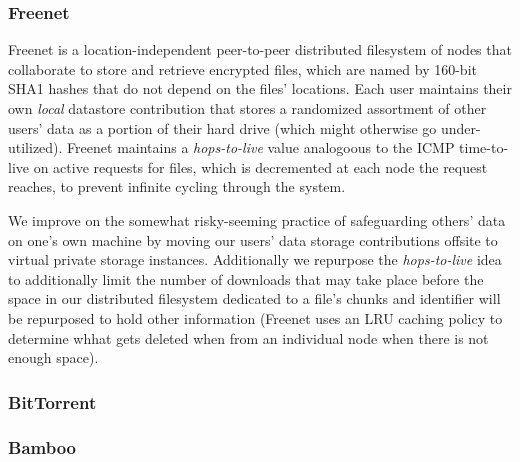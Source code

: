 \subsubsection*{Freenet}

Freenet is a location-independent peer-to-peer distributed filesystem of nodes that collaborate to store and retrieve encrypted files,
which are named by 160-bit SHA1 hashes that do not depend on the files' locations. Each user maintains their own \textit{local} datastore
contribution that stores a randomized assortment of other users' data as a portion of their hard drive (which might otherwise go
under-utilized). Freenet maintains a \textit{hops-to-live} value analogoous to
the ICMP time-to-live on active requests for files, which is decremented at each node the request reaches, to prevent infinite cycling
through the system.

We improve on the somewhat risky-seeming practice of safeguarding others' data on one's own machine by moving our
users' data storage contributions offsite to virtual private storage instances.
Additionally we repurpose the \textit{hops-to-live} idea to additionally limit the number of
downloads that may take place before the space in our distributed filesystem dedicated to a file's chunks and identifier will be
repurposed to hold other information (Freenet uses an LRU caching policy to determine whhat gets deleted when from an individual node
when there is not enough space).

\subsubsection*{BitTorrent} %


\subsubsection*{Bamboo}

